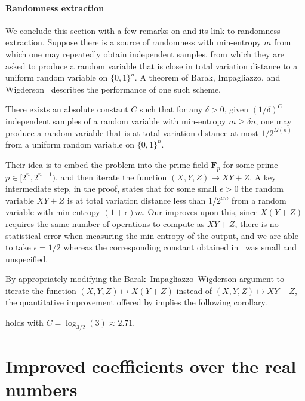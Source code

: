\documentclass[twoside, 10pt]{article}
\newcommand\eps{\epsilon}
\newcommand\FF{{\mathbf{F}}}
\begin{document}
\paragraph{Randomness extraction}
We conclude this section with a few remarks on  and its link to randomness extraction.
Suppose there is a source of randomness with min-entropy $m$ from 
which one may repeatedly obtain independent samples, from which they
are asked to produce a random variable that is close in total 
variation distance to a uniform random variable on $\{0,1\}^n$.
A theorem of Barak, Impagliazzo, and Wigderson~\cite{biw2006} 
describes the performance of one such scheme.

\begin{theorem}\label{thmBIW}
There exists an absolute constant $C$ such that for any $\delta > 0$, given $(1/\delta)^{C}$ independent samples of a random variable with min-entropy $m \ge\delta n$, one may produce a random variable that is at total variation distance at most $1/2^{\Omega(n)}$ from a uniform random variable on $\{0,1\}^n$.
\end{theorem}

Their idea is to embed the problem into the prime field $\FF_p$ for some 
prime $p\in [2^n, 2^{n+1})$, and then iterate the function 
$(X,Y,Z)\mapsto XY+Z$. A key intermediate step,
\cite[Lemma~3.1]{biw2006} in the proof, states that for some 
small $\eps>0$ the random variable $XY+Z$ is at total variation distance 
less than $1/2^{\eps m}$ from a random variable with min-entropy $(1+\eps)m$. 
Our  improves upon this, since $X(Y+Z)$ requires 
the same number of operations to compute as $XY+Z$, there is no statistical 
error when measuring the min-entropy of the output, and we are able to 
take $\eps = 1/2$ whereas the corresponding constant obtained 
in~\cite{biw2006} was small and unspecified.

By appropriately modifying the Barak--Impagliazzo--Wigderson argument 
to iterate the function $(X,Y,Z) \mapsto X(Y+Z)$ instead of 
$(X,Y,Z)\mapsto XY+Z$, the quantitative improvement offered by
 implies the following corollary.

\begin{corollary}
 holds with $C = \log_{3/2}(3)\approx 2.71$.
\end{corollary}

\section{Improved coefficients over the real numbers}
\end{document}
